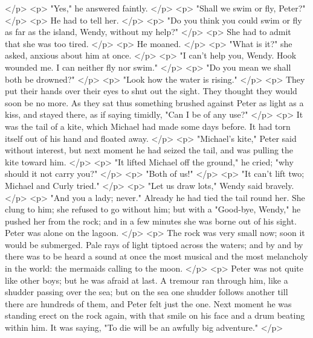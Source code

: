    </p>
    <p>
      "Yes," he answered faintly.
    </p>
    <p>
      "Shall we swim or fly, Peter?"
    </p>
    <p>
      He had to tell her.
    </p>
    <p>
      "Do you think you could swim or fly as far as the island, Wendy, without
      my help?"
    </p>
    <p>
      She had to admit that she was too tired.
    </p>
    <p>
      He moaned.
    </p>
    <p>
      "What is it?" she asked, anxious about him at once.
    </p>
    <p>
      "I can't help you, Wendy. Hook wounded me. I can neither fly nor swim."
    </p>
    <p>
      "Do you mean we shall both be drowned?"
    </p>
    <p>
      "Look how the water is rising."
    </p>
    <p>
      They put their hands over their eyes to shut out the sight. They thought
      they would soon be no more. As they sat thus something brushed against
      Peter as light as a kiss, and stayed there, as if saying timidly, "Can I
      be of any use?"
    </p>
    <p>
      It was the tail of a kite, which Michael had made some days before. It had
      torn itself out of his hand and floated away.
    </p>
    <p>
      "Michael's kite," Peter said without interest, but next moment he had
      seized the tail, and was pulling the kite toward him.
    </p>
    <p>
      "It lifted Michael off the ground," he cried; "why should it not carry
      you?"
    </p>
    <p>
      "Both of us!"
    </p>
    <p>
      "It can't lift two; Michael and Curly tried."
    </p>
    <p>
      "Let us draw lots," Wendy said bravely.
    </p>
    <p>
      "And you a lady; never." Already he had tied the tail round her. She clung
      to him; she refused to go without him; but with a "Good-bye, Wendy," he
      pushed her from the rock; and in a few minutes she was borne out of his
      sight. Peter was alone on the lagoon.
    </p>
    <p>
      The rock was very small now; soon it would be submerged. Pale rays of
      light tiptoed across the waters; and by and by there was to be heard a
      sound at once the most musical and the most melancholy in the world: the
      mermaids calling to the moon.
    </p>
    <p>
      Peter was not quite like other boys; but he was afraid at last. A tremour
      ran through him, like a shudder passing over the sea; but on the sea one
      shudder follows another till there are hundreds of them, and Peter felt
      just the one. Next moment he was standing erect on the rock again, with
      that smile on his face and a drum beating within him. It was saying, "To
      die will be an awfully big adventure."
    </p>
